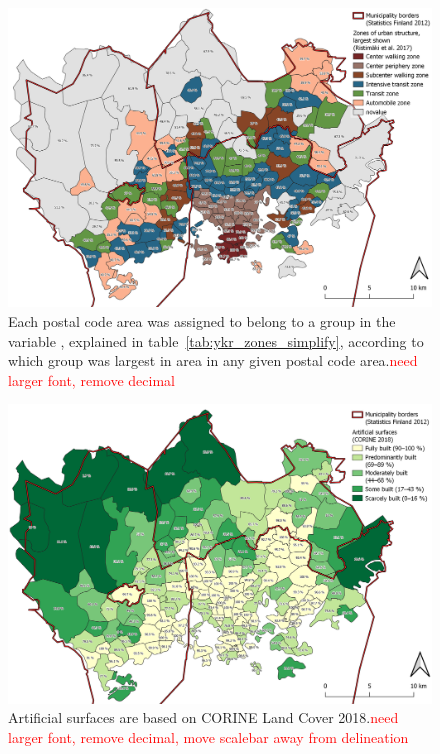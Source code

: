 \begin{figure}[H]%
    \centering
    \includegraphics[width=\textwidth]{images/thesis_postalvis_ykrzone.png}
    \caption[Calculated zones of urban structure in the study area]{Each postal code area was assigned to belong to a group in the variable , explained in table~\ref{tab:ykr_zones_simplify}, according to which group was largest in area in any given postal code area.\textcolor{red}{need larger font, remove decimal}}%
    \label{fig:postalvis_ykrzone}%
\end{figure}

\begin{figure}[H]%
    \centering
    \includegraphics[width=\textwidth]{images/thesis_postalvis_artificial.png}
    \caption[Calculated zones of built surfaces in the study area]{Artificial surfaces are based on CORINE Land Cover 2018.\textcolor{red}{need larger font, remove decimal, move scalebar away from delineation}}%
    \label{fig:postalvis_artificial}%
\end{figure}

